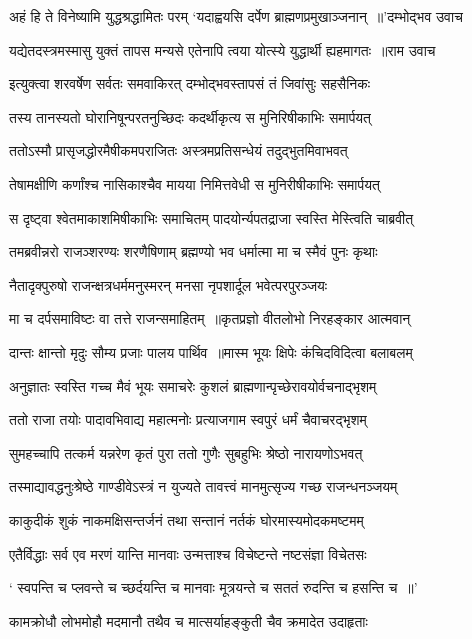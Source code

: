\threelineshloka
{अहं हि ते विनेष्यामि युद्धश्रद्धामितः परम्}
{`यदाह्वयसि दर्पेण ब्राह्मणप्रमुखाञ्जनान् ॥'दम्भोद्भव उवाच}
{}


\threelineshloka
{यद्येतदस्त्रमस्मासु युक्तं तापस मन्यसे}
{एतेनापि त्वया योत्स्ये युद्धार्थी ह्यहमागतः ॥राम उवाच}
{}


\twolineshloka
{इत्युक्त्वा शरवर्षेण सर्वतः समवाकिरत्}
{दम्भोद्भवस्तापसं तं जिवांसुः सहसैनिकः}


\twolineshloka
{तस्य तानस्यतो घोरानिषून्परतनुच्छिदः}
{कदर्थीकृत्य स मुनिरिषीकाभिः समार्पयत्}


\twolineshloka
{ततोऽस्मौ प्रासृजद्धोरमैषीकमपराजितः}
{अस्त्रमप्रतिसन्धेयं तदुद्भुतमिवाभवत्}


\twolineshloka
{तेषामक्षीणि कर्णांश्च नासिकाश्चैव मायया}
{निमित्तवेधी स मुनिरीषीकाभिः समार्पयत्}


\twolineshloka
{स दृष्ट्वा श्वेतमाकाशमिषीकाभिः समाचितम्}
{पादयोर्न्यपतद्राजा स्वस्ति मेस्त्विति चाब्रवीत्}


\twolineshloka
{तमब्रवीन्नरो राजञ्शरण्यः शरणैषिणाम्}
{ब्रह्मण्यो भव धर्मात्मा मा च स्मैवं पुनः कृथाः}


\twolineshloka
{नैतादृक्पुरुषो राजन्क्षत्रधर्ममनुस्मरन्}
{मनसा नृपशार्दूल भवेत्परपुरञ्जयः}


\twolineshloka
{मा च दर्पसमाविष्टः वा तत्ते राजन्समाहितम् ॥कृतप्रज्ञो वीतलोभो निरहङ्कार आत्मवान्}
{}


\twolineshloka
{दान्तः क्षान्तो मृदुः सौम्य प्रजाः पालय पार्थिव ॥मास्म भूयः क्षिपेः कंचिदविदित्वा बलाबलम्}
{}


\twolineshloka
{अनुज्ञातः स्वस्ति गच्च मैवं भूयः समाचरेः}
{कुशलं ब्राह्मणान्पृच्छेरावयोर्वचनाद्भृशम्}


\twolineshloka
{ततो राजा तयोः पादावभिवाद्य महात्मनोः}
{प्रत्याजगाम स्वपुरं धर्मं चैवाचरद्भृशम्}


\twolineshloka
{सुमहच्चापि तत्कर्म यन्नरेण कृतं पुरा}
{ततो गुणैः सुबहुभिः श्रेष्ठो नारायणोऽभवत्}


\twolineshloka
{तस्माद्यावद्धनुःश्रेष्ठे गाण्डीवेऽस्त्रं न युज्यते}
{तावत्त्वं मानमुत्सृज्य गच्छ राजन्धनञ्जयम्}


\twolineshloka
{काकुदीकं शुकं नाकमक्षिसन्तर्जनं तथा}
{सन्तानं नर्तकं घोरमास्यमोदकमष्टमम्}


\twolineshloka
{एतैर्विद्धाः सर्व एव मरणं यान्ति मानवाः}
{उन्मत्ताश्च विचेष्टन्ते नष्टसंज्ञा विचेतसः}


\twolineshloka
{` स्वपन्ति च प्लवन्ते च च्छर्दयन्ति च मानवाः}
{मूत्रयन्ते च सततं रुदन्ति च हसन्ति च ॥'}


\twolineshloka
{कामक्रोधौ लोभमोहौ मदमानौ तथैव च}
{मात्सर्याहङ्कुती चैव क्रमादेत उदाहृताः}


